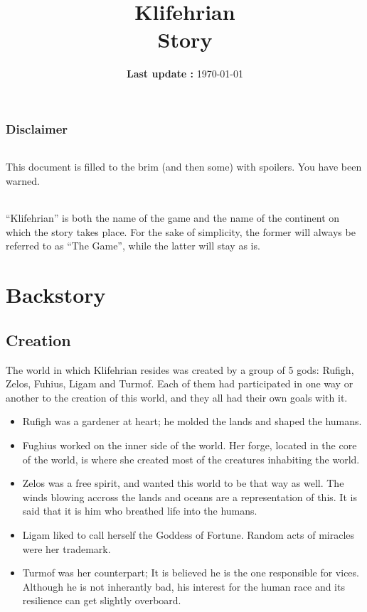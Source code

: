 \documentclass[a4paper,12pt]{book}
\title{\Huge{Klifehrian} \\ \large{Story}}
\date{\textbf{Last update :} \today}
\begin{document}
	\maketitle
	\thispagestyle{empty}
	\setcounter{page}{0}
	\section{Disclaimer}
		\paragraph{} This document is filled to the brim (and then some) with spoilers. You have been warned.
		
		\paragraph{} ``Klifehrian'' is both the name of the game and the name of the continent on which the story takes place. For the sake of simplicity, the former will always be referred to as ``The Game'', while the latter will stay as is.
	\part{Backstory}
		\chapter{Creation} 
			The world in which Klifehrian resides was created by a group of 5 gods: Rufigh, Zelos, Fuhius, Ligam and Turmof. Each of them had participated in one way or another to the creation of this world, and they all had their own goals with it.
			\begin{itemize}
				\item Rufigh was a gardener at heart; he molded the lands and shaped the humans.
				\item Fughius worked on the inner side of the world. Her forge, located in the core of the world, is where she created most of the creatures inhabiting the world.
				\item Zelos was a free spirit, and wanted this world to be that way as well. The winds blowing accross the lands and oceans are a representation of this. It is said that it is him who breathed life into the humans.
				\item Ligam liked to call herself the Goddess of Fortune. Random acts of miracles were her trademark.
				\item Turmof was her counterpart; It is believed he is the one responsible for vices. Although he is not inherantly bad, his interest for the human race and its resilience can get slightly overboard.
			\end{itemize}
\end{document}
